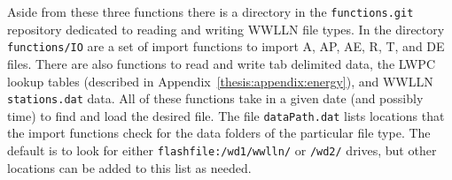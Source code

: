 Aside from these three functions there is a directory in the \texttt{functions.git} repository dedicated to reading and writing WWLLN file types.
In the directory \texttt{functions/IO} are a set of import functions to import A, AP, AE, R, T, and DE files.
There are also functions to read and write tab delimited data, the LWPC lookup tables (described in Appendix~\ref{thesis:appendix:energy}), and WWLLN \texttt{stations.dat} data.
All of these functions take in a given date (and possibly time) to find and load the desired file.
The file \texttt{dataPath.dat} lists locations that the import functions check for the data folders of the particular file type.
The default is to look for either \texttt{flashfile:/wd1/wwlln/} or \texttt{/wd2/} drives, but other locations can be added to this list as needed.
